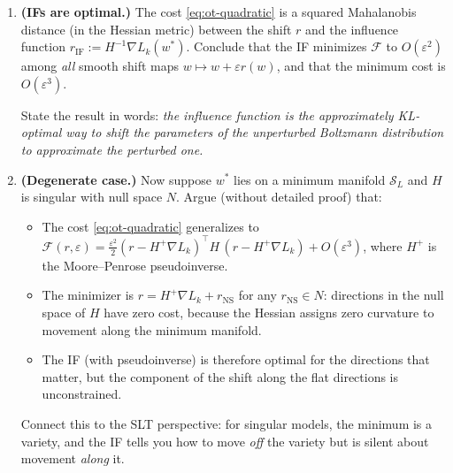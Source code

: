 \documentclass[11pt]{article}
\begin{document}
\begin{exercise}
\begin{enumerate}
  \emph{Hint:} After substitution, the terms that do not depend on $r$ should assemble into $\tfrac{\varepsilon^2}{2}\nabla L_k^\top H^{-1}\nabla L_k$ and cancel with the partition-function contribution, leaving a perfect square.

  \item \textbf{(IFs are optimal.)} The cost \eqref{eq:ot-quadratic} is a squared Mahalanobis distance (in the Hessian metric) between the shift $r$ and the influence function $r_{\mathrm{IF}} := H^{-1}\nabla L_k(w^*)$. Conclude that the IF minimizes $\mathcal{F}$ to $O(\varepsilon^2)$ among \emph{all} smooth shift maps $w\mapsto w+\varepsilon r(w)$, and that the minimum cost is $O(\varepsilon^3)$.

  State the result in words: \emph{the influence function is the approximately KL-optimal way to shift the parameters of the unperturbed Boltzmann distribution to approximate the perturbed one.}

  \item \textbf{(Degenerate case.)} Now suppose $w^*$ lies on a minimum manifold $\mathcal{S}_L$ and $H$ is singular with null space $N$. Argue (without detailed proof) that:
  \begin{itemize}
    \item The cost \eqref{eq:ot-quadratic} generalizes to $\mathcal{F}(r,\varepsilon) = \tfrac{\varepsilon^2}{2}(r - H^+\nabla L_k)^\top H\,(r - H^+\nabla L_k) + O(\varepsilon^3)$, where $H^+$ is the Moore--Penrose pseudoinverse.
    \item The minimizer is $r = H^+\nabla L_k + r_{\mathrm{NS}}$ for any $r_{\mathrm{NS}}\in N$: directions in the null space of $H$ have zero cost, because the Hessian assigns zero curvature to movement along the minimum manifold.
    \item The IF (with pseudoinverse) is therefore optimal for the directions that matter, but the component of the shift along the flat directions is unconstrained.
  \end{itemize}
  Connect this to the SLT perspective: for singular models, the minimum is a variety, and the IF tells you how to move \emph{off} the variety but is silent about movement \emph{along} it.


\end{enumerate}
\end{exercise}
\end{document}
